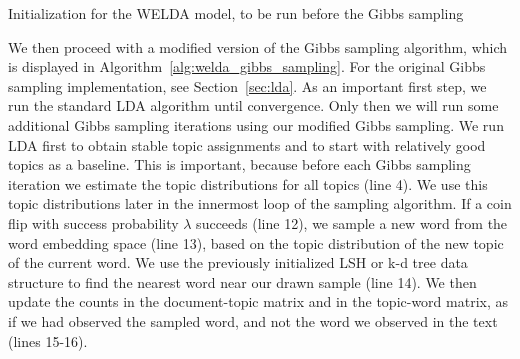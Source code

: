 \documentclass[
        a4paper,
        titlepage,
        twoside,
        parskip
        ]{scrbook}
\theoremstyle{break}
\begin{document}


\begin{algorithm}
  \caption{Initialization for the WELDA model, to be run before the Gibbs sampling}
  \label{alg:welda_init}
  \begin{algorithmic}[1]
    \EndFor
    \EndProcedure
  \end{algorithmic}
\end{algorithm}

We then proceed with a modified version of the Gibbs sampling algorithm, which is displayed in Algorithm~\ref{alg:welda_gibbs_sampling}.
For the original Gibbs sampling implementation, see Section~\ref{sec:lda}.
As an important first step, we run the standard LDA algorithm until convergence.
Only then we will run some additional Gibbs sampling iterations using our modified Gibbs sampling.
We run LDA first to obtain stable topic assignments and to start with relatively good topics as a baseline.
This is important, because before each Gibbs sampling iteration we estimate the topic distributions for all topics (line 4).
We use this topic distributions later in the innermost loop of the sampling algorithm.
If a coin flip with success probability $\lambda$ succeeds (line 12), we sample a new word from the word embedding space (line 13), based on the topic distribution of the new topic of the current word.
We use the previously initialized LSH or k-d tree data structure to find the nearest word near our drawn sample (line 14).
We then update the counts in the document-topic matrix and in the topic-word matrix, as if we had observed the sampled word, and not the word we observed in the text (lines 15-16).
\end{document}
